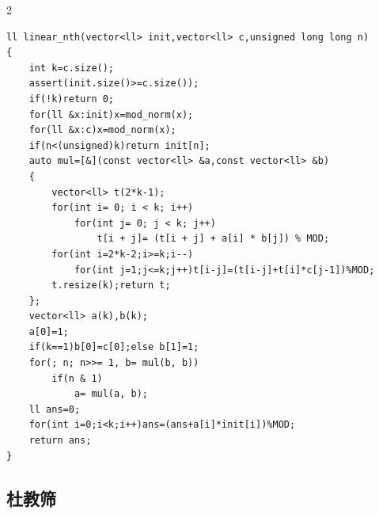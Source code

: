 \documentclass[UTF8,fontset=fandol,a4paper,twoside]{ctexart}
\begin{document}
\begin{multicols}{2}
\begin{lstlisting}
ll linear_nth(vector<ll> init,vector<ll> c,unsigned long long n)
{
    int k=c.size();
    assert(init.size()>=c.size());
    if(!k)return 0;
    for(ll &x:init)x=mod_norm(x);
    for(ll &x:c)x=mod_norm(x);
    if(n<(unsigned)k)return init[n];
    auto mul=[&](const vector<ll> &a,const vector<ll> &b)
    {
        vector<ll> t(2*k-1);
        for(int i= 0; i < k; i++)
            for(int j= 0; j < k; j++)
                t[i + j]= (t[i + j] + a[i] * b[j]) % MOD;
        for(int i=2*k-2;i>=k;i--)
            for(int j=1;j<=k;j++)t[i-j]=(t[i-j]+t[i]*c[j-1])%MOD;
        t.resize(k);return t;
    };
    vector<ll> a(k),b(k);
    a[0]=1;
    if(k==1)b[0]=c[0];else b[1]=1;
    for(; n; n>>= 1, b= mul(b, b))
        if(n & 1)
            a= mul(a, b);
    ll ans=0;
    for(int i=0;i<k;i++)ans=(ans+a[i]*init[i])%MOD;
    return ans;
}
\end{lstlisting}
\subsection{杜教筛}


\end{multicols}
\end{document}
